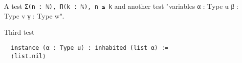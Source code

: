 \documentclass[12pt]{article}
\begin{document}
A test \lstinline{Σ(n : ℕ), Π(k : ℕ), n ≤ k} and another test "variables {α : Type u} {β : Type v} {γ : Type w}".

Third test
\begin{lstlisting}
  instance (α : Type u) : inhabited (list α) :=
  ⟨list.nil⟩
\end{lstlisting}
\end{document}
